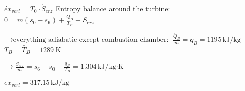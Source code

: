 \( \dot{ex}_{verl} = T_0 \cdot \dot{S}_{erz} \)  
Entropy balance around the turbine:  
\( 0 = \dot{m} (s_0 - s_6) + \frac{\dot{Q}_B}{T_B} + \dot{S}_{erz} \)  

\( \rightarrow \text{everything adiabatic except combustion chamber:} \)  
\( \frac{\dot{Q}_B}{\dot{m}} = q_B = 1195 \, \text{kJ/kg} \)  
\( T_B = \bar{T}_B = 1289 \, \text{K} \)  

\( \rightarrow \frac{\dot{S}_{erz}}{\dot{m}} = s_6 - s_0 - \frac{q_B}{T_B} = 1.304 \, \text{kJ/kg·K} \)  

\( ex_{verl} = 317.15 \, \text{kJ/kg} \)